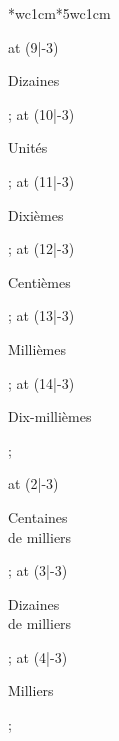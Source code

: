 {{{\begin{center}
\begin{NiceTabular}{*{}{wc{1cm}}*{5}{wc{1cm}}}
{{            \tikz\node[rotate=58] at (9|-3) {\begin{minipage}{1.5cm}\begin{center}\scriptsize Dizaines\end{center}\end{minipage}};
            \tikz\node[rotate=58] at (10|-3) {\begin{minipage}{1.5cm}\begin{center}\scriptsize Unités\end{center}\end{minipage}};
            \tikz\node[rotate=58] at (11|-3) {\begin{minipage}{1.5cm}\begin{center}\scriptsize Dixièmes\end{center}\end{minipage}};
            \tikz\node[rotate=58] at (12|-3) {\begin{minipage}{1.5cm}\begin{center}\scriptsize Centièmes\end{center}\end{minipage}};
            \tikz\node[rotate=58] at (13|-3) {\begin{minipage}{1.5cm}\begin{center}\scriptsize Millièmes\end{center}\end{minipage}};
            \tikz\node[rotate=58] at (14|-3) {\begin{minipage}{2cm}\begin{center}\scriptsize Dix-millièmes\end{center}\end{minipage}};
          }{%
            \tikz\node[rotate=58] at (2|-3) {\begin{minipage}{1.5cm}\begin{center}\scriptsize Centaines\\de milliers\end{center}\end{minipage}};
            \tikz\node[rotate=58] at (3|-3) {\begin{minipage}{1.5cm}\begin{center}\scriptsize Dizaines\\de milliers\end{center}\end{minipage}};
            \tikz\node[rotate=58] at (4|-3) {\begin{minipage}{1.5cm}\begin{center}\scriptsize Milliers\end{center}\end{minipage}};
}}
\end{NiceTabular}
\end{center}}}}
